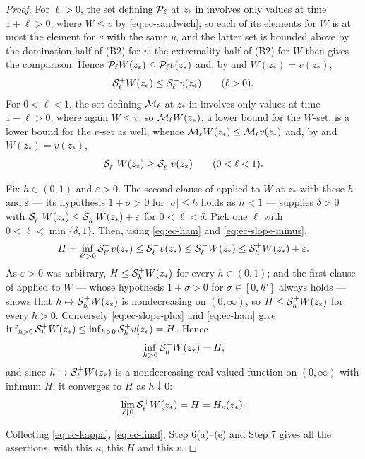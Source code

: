 \begin{proof}
For $\ell>0$, the set defining $\mathcal{P}_\ell$ at $z_*$ in 
involves only values at time $1+\ell>0$, where $W\le v$ by
\eqref{eq:ec-sandwich}; so each of its elements for $W$ is at most the element
for $v$ with the same $y$, and the latter set is bounded above by the
domination half of (B2) for $v$; the extremality half of (B2) for $W$ then gives
the comparison.
Hence $\mathcal{P}_\ell W(z_*)\le\mathcal{P}_\ell v(z_*)$ and, by  and
$W(z_*)=v(z_*)$,
\begin{equation}\label{eq:ec-slope-plus}
  \mathcal{S}_\ell^+W(z_*)\le\mathcal{S}_\ell^+v(z_*)\qquad(\ell>0).
\end{equation}
For $0<\ell<1$, the set defining $\mathcal{M}_\ell$ at $z_*$ in 
involves only values at time $1-\ell>0$, where again $W\le v$; so
$\mathcal{M}_\ell W(z_*)$, a lower bound for the $W$-set, is a lower bound for the
$v$-set as well, whence $\mathcal{M}_\ell W(z_*)\le\mathcal{M}_\ell v(z_*)$ and, by
 and $W(z_*)=v(z_*)$,
\begin{equation}\label{eq:ec-slope-minus}
  \mathcal{S}_\ell^-W(z_*)\ge\mathcal{S}_\ell^-v(z_*)\qquad(0<\ell<1).
\end{equation}

Fix $h\in(0,1)$ and $\varepsilon>0$. The second clause of
 applied to $W$ at $z_*$ with these $h$ and
$\varepsilon$ --- its hypothesis $1+\sigma>0$ for $|\sigma|\le h$ holds as
$h<1$ --- supplies $\delta>0$ with
$\mathcal{S}_\ell^-W(z_*)\le\mathcal{S}_h^+W(z_*)+\varepsilon$ for $0<\ell<\delta$. Pick
one $\ell$ with $0<\ell<\min\{\delta,1\}$. Then, using
\eqref{eq:ec-ham} and \eqref{eq:ec-slope-minus},
\[
  H=\inf_{\ell'>0}\mathcal{S}_{\ell'}^-v(z_*)\le\mathcal{S}_\ell^-v(z_*)
   \le\mathcal{S}_\ell^-W(z_*)\le\mathcal{S}_h^+W(z_*)+\varepsilon .
\]
As $\varepsilon>0$ was arbitrary, $H\le\mathcal{S}_h^+W(z_*)$ for every
$h\in(0,1)$; and the first clause of  applied to
$W$ --- whose hypothesis $1+\sigma>0$ for $\sigma\in[0,h']$ always holds ---
shows that $h\mapsto\mathcal{S}_h^+W(z_*)$ is nondecreasing on $(0,\infty)$, so
$H\le\mathcal{S}_h^+W(z_*)$ for every $h>0$. Conversely
\eqref{eq:ec-slope-plus} and \eqref{eq:ec-ham} give
$\inf_{h>0}\mathcal{S}_h^+W(z_*)\le\inf_{h>0}\mathcal{S}_h^+v(z_*)=H$. Hence
\[
  \inf_{h>0}\mathcal{S}_h^+W(z_*)=H,
\]
and since $h\mapsto\mathcal{S}_h^+W(z_*)$ is a nondecreasing real-valued function on
$(0,\infty)$ with infimum $H$, it converges to $H$ as $h\downarrow0$:
\[
  \lim_{\ell\downarrow0}\mathcal{S}_\ell^+W(z_*)=H=H_v(z_*).
\]

Collecting \eqref{eq:ec-kappa}, \eqref{eq:ec-final}, Step 6(a)--(e) and Step 7
gives all the assertions, with this $\kappa$, this $H$ and this $v$.
\end{proof}
